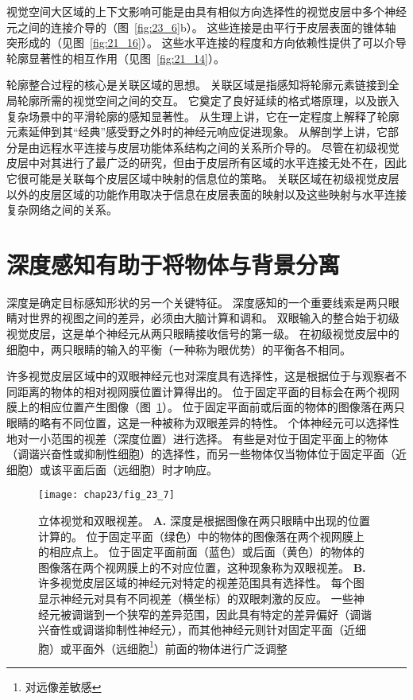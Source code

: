 视觉空间大区域的上下文影响可能是由具有相似方向选择性的视觉皮层中多个神经元之间的连接介导的（图~\ref{fig:23_6}b）。
这些连接是由平行于皮层表面的锥体轴突形成的（见图~\ref{fig:21_16}）。
这些水平连接的程度和方向依赖性提供了可以介导轮廓显著性的相互作用（见图~\ref{fig:21_14}）。


轮廓整合过程的核心是关联区域的思想。
关联区域是指感知将轮廓元素链接到全局轮廓所需的视觉空间之间的交互。
它奠定了良好延续的格式塔原理，以及嵌入复杂场景中的平滑轮廓的感知显著性。
从生理上讲，它在一定程度上解释了轮廓元素延伸到其“经典”感受野之外时的神经元响应促进现象。
从解剖学上讲，它部分是由远程水平连接与皮层功能体系结构之间的关系所介导的。
尽管在初级视觉皮层中对其进行了最广泛的研究，但由于皮层所有区域的水平连接无处不在，因此它很可能是关联每个皮层区域中映射的信息位的策略。
关联区域在初级视觉皮层以外的皮层区域的功能作用取决于信息在皮层表面的映射以及这些映射与水平连接复杂网络之间的关系。



\section{深度感知有助于将物体与背景分离}

深度是确定目标感知形状的另一个关键特征。
深度感知的一个重要线索是两只眼睛对世界的视图之间的差异，必须由大脑计算和调和。
双眼输入的整合始于初级视觉皮层，这是单个神经元从两只眼睛接收信号的第一级。
在初级视觉皮层中的细胞中，两只眼睛的输入的平衡（一种称为眼优势）的平衡各不相同。


许多视觉皮层区域中的双眼神经元也对深度具有选择性，这是根据位于与观察者不同距离的物体的相对视网膜位置计算得出的。
位于固定平面的目标会在两个视网膜上的相应位置产生图像（图~\ref{fig:23_7}）。
位于固定平面前或后面的物体的图像落在两只眼睛的略有不同位置，这是一种被称为双眼差异的特性。
个体神经元可以选择性地对一小范围的视差（深度位置）进行选择。
有些是对位于固定平面上的物体（调谐兴奋性或抑制性细胞）的选择性，而另一些物体仅当物体位于固定平面（近细胞）或该平面后面（远细胞）时才响应。


\begin{figure}[htbp]
	\centering
	\texttt{[image: chap23/fig\_23\_7]}
	\caption{立体视觉和双眼视差。
		\textbf{A.} 深度是根据图像在两只眼睛中出现的位置计算的。
		位于固定平面（绿色）中的物体的图像落在两个视网膜上的相应点上。
		位于固定平面前面（蓝色）或后面（黄色）的物体的图像落在两个视网膜上的不对应位置，这种现象称为双眼视差。
		\textbf{B.} 许多视觉皮层区域的神经元对特定的视差范围具有选择性。
		每个图显示神经元对具有不同视差（横坐标）的双眼刺激的反应。
		一些神经元被调谐到一个狭窄的差异范围，因此具有特定的差异偏好（调谐兴奋性或调谐抑制性神经元），而其他神经元则针对固定平面（近细胞）或平面外（远细胞\footnote{对远像差敏感}）前面的物体进行广泛调整\cite{poggio1995mechanisms}}
	\label{fig:23_7}
\end{figure}



